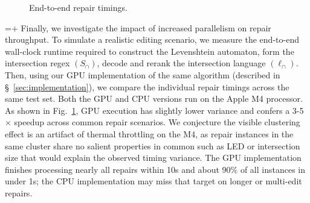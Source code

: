 \documentclass[popl.tex]{subfiles}
\begin{document}
\begin{figure}
\vspace{-0.3cm}
\centering
\resizebox{\linewidth}{!}{}
\vspace{-0.6cm}
\caption{End-to-end repair timings.}
\label{fig:timings}
\end{figure}
\noindent\leavevmode\par\vspace{-\baselineskip}
\begingroup
\hangindent=\textwidth+\columnsep\relax
\noindent Finally, we investigate the impact of increased parallelism on repair throughput. To simulate a realistic editing scenario, we measure the end-to-end wall-clock runtime required to construct the Levenshtein automaton, form the intersection regex $(S_\cap)$, decode and rerank the intersection language $(\ell_\cap)$. Then, using our GPU implementation of the same algorithm (described in \S~\ref{sec:implementation}), we compare the individual repair timings across the same test set. Both the GPU and CPU versions run on the Apple M4 processor. As shown in Fig.~\ref{fig:timings}, GPU execution has slightly lower variance and confers a 3-5$\times$ speedup across common repair scenarios. We conjecture the visible clustering effect is an artifact of thermal throttling on the M4, as repair instances in the same cluster share no salient properties in common such as LED or intersection size that would explain the observed timing variance. The GPU implementation finishes processing nearly all repairs within 10s and about $90\%$ of all instances in under 1s; the CPU implementation may miss that target on longer or multi-edit repairs.
\par\endgroup
\ifSubfilesClassLoaded{\par\clearpage}{}
\end{document}
